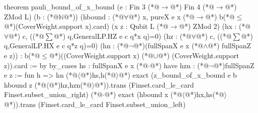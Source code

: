 theorem pauli_bound_of_x_bound (e : Fin 3 (*@$\to$@*) Fin 4 (*@$\to$@*) ZMod L) (b : (*@$\mathbb N$@*))
    (hbound : (*@$\forall$@*) x, pureX e x (*@$\to$@*) b(*@$\le$@*)(CoverWeight.support x).card)
    (x z : Qubit L (*@$\to$@*) ZMod 2)
    (hx : (*@$\forall$@*) c, ((*@$\sum$@*) q,GeneralLP.HZ e c q*x q)=0)
    (hz : (*@$\forall$@*) c, ((*@$\sum$@*) q,GeneralLP.HX e c q*z q)=0)
    (hn : (*@$\neg$@*)(fullSpanX e x (*@$\land$@*) fullSpanZ e z)) :
    b(*@$\le$@*)((CoverWeight.support x) (*@$\cup$@*) (CoverWeight.support z)).card := by
  by_cases hs : fullSpanX e x
  (*@$\cdot$@*) have hzn : (*@$\neg$@*)fullSpanZ e z := fun h => hn (*@$\langle$@*)hs,h(*@$\rangle$@*)
    exact (z_bound_of_x_bound e b hbound z (*@$\langle$@*)hz,hzn(*@$\rangle$@*)).trans
      (Finset.card_le_card Finset.subset_union_right)
  (*@$\cdot$@*) exact (hbound x (*@$\langle$@*)hx,hs(*@$\rangle$@*)).trans (Finset.card_le_card Finset.subset_union_left)
